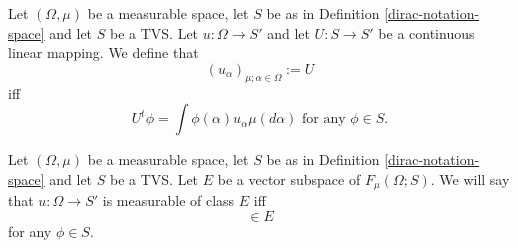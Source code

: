 \documentclass[main.tex]{subfiles}
\begin{document}
\begin{definition}
Let $(\Omega, \mu)$ be a measurable space, let $S$ be as in Definition \ref{dirac-notation-space} and let $S$ be a TVS. Let $u:\Omega\to S'$ and let $U:S\to S'$ be a continuous linear mapping. We define that 
\begin{equation}
(u_\alpha)_{\mu;\alpha\in \Omega} := U
\end{equation}
iff
\begin{equation}
U^t\phi = \int \phi(\alpha) u_\alpha \mu(d\alpha) \text{ for any } \phi\in S.
\end{equation}
\end{definition}
\begin{definition}
Let $(\Omega, \mu)$ be a measurable space, let $S$ be as in Definition \ref{dirac-notation-space} and let $S$ be a TVS. Let $E$ be a vector subspace of $F_\mu(\Omega; S)$. We will say that $u:\Omega\to S'$ is measurable of class $E$ iff
\begin{equation}
[\Omega\ni\alpha\mapsto u_\alpha(\phi)\in\C] \in E
\end{equation}
for any $\phi\in S$.
\end{definition}
\end{document}
